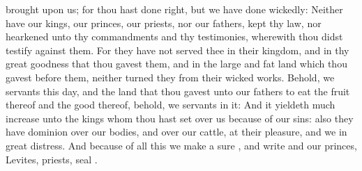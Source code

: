 {brought upon us; for thou hast
done
right, but we have done
wickedly:
Neither have our
kings, our
princes, our
priests, nor our
fathers,
kept thy
law, nor
hearkened unto thy
commandments and thy
testimonies, wherewith thou didst
testify against them.
For they have not
served thee in their
kingdom, and in thy
great
goodness that thou
gavest them, and in the
large and
fat
land which thou
gavest
before them, neither
turned they from their
wicked
works.
Behold, we
{}
servants this
day, and
{} the
land that thou
gavest unto our
fathers to
eat the
fruit thereof and the
good thereof, behold, we
{}
servants in it:
And it yieldeth
much
increase unto the
kings whom thou hast
set over us because of our
sins: also they have
dominion over our
bodies, and over our
cattle, at their
pleasure, and we
{} in
great
distress.
And because of all this we
make a
sure
{}, and
write
{} and our
princes,
Levites,
{}
priests,
seal
{}.

}
